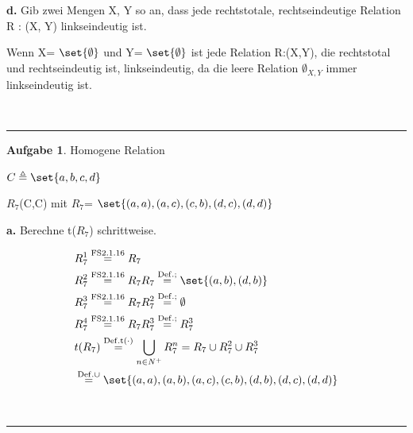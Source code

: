 \documentclass[10pt,leqno ]{article}
\DeclarePairedDelimiter\set\{\}
\newcommand\customeq[1]{\overset{\mathrm{#1}}{=}}
\theoremstyle{definition}
\newtheorem{problem}[theorem]{Aufgabe}
\newenvironment{solution}[1][L]{\begin{doublespace}\textbf{#1.}\quad }{\ \rule{0.5em}{0.5em}\end{doublespace}}
\begin{document}
\begin{solution}[d] 
Gib zwei Mengen X, Y so an, dass jede rechtstotale, rechtseindeutige Relation R : (X, Y)
linkseindeutig ist.
   
   Wenn 
   X= \(\set {\emptyset} \)
   und Y= \(\set {\emptyset}\)
   ist jede Relation R:(X,Y), die rechtstotal und rechtseindeutig ist, linkseindeutig, da die leere Relation \(\emptyset_{X,Y}\) immer linkseindeutig ist.

   
\end{solution}

\begin{problem}
Homogene Relation
\end{problem}

   \( C \triangleq \set{ a,b,c,d} \)

   $R_7$(C,C) mit $R_7$= \( \set{ (a,a),(a,c),(c,b),(d,c),(d,d)} \)

\begin{solution}[a]
Berechne t(\(R_7\)) schrittweise.

\begin{equation*}
   \begin{aligned}
    & R_{7}^1 \customeq{FS 2.1.16} R_7 \\
    & R_{7}^2 \customeq{FS 2.1.16} R_{7}R_{7} \customeq{Def. ;} \set{(a,b),(d,b)}\\
    & R_{7}^3 \customeq{FS 2.1.16} R_{7}R_7^2 \customeq{Def. ;} \emptyset\\
    & R_{7}^4 \customeq{FS 2.1.16} R_{7}R_7^3 \customeq{Def. ;} R_7^3 \\
    & t(R_7) \customeq{Def. t(\cdot)} \bigcup\limits_{n \in N^+} R_7^n = R_7 \cup R_7^2 \cup R_7^3\\
    & \customeq{Def. \cup} \set{(a,a),(a,b),(a,c),(c,b),(d,b),(d,c),(d,d)}
   \end{aligned}
\end{equation*}

\end{solution}
\end{document}
